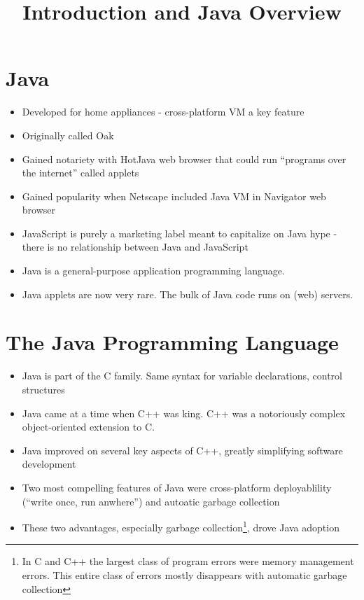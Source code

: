 \documentclass{article}
\title{Introduction and Java Overview}
\date{}
\begin{document}
\maketitle

\section{Java}

\begin{itemize}
\item Developed for home appliances - cross-platform VM a key feature
\item Originally called Oak
\item Gained notariety with HotJava web browser that could run ``programs over the internet'' called applets
\item Gained popularity when Netscape included Java VM in Navigator web browser
\item JavaScript is purely a marketing label meant to capitalize on Java hype - there is no relationship between Java and JavaScript
\item  Java is a general-purpose application programming language.
\item Java applets are now very rare.  The bulk of Java code runs on (web) servers.
\end{itemize}


\section{The Java Programming Language}


\begin{itemize}
\item Java is part of the C family.  Same syntax for variable
  declarations, control structures
\item Java came at a time when C++ was king.  C++ was a notoriously complex
  object-oriented extension to C.
\item Java improved on several key aspects of C++, greatly simplifying
  software development
\item Two most compelling features of Java were cross-platform
  deployablility (``write once, run anwhere'') and autoatic garbage
  collection
\item These two advantages, especially garbage collection\footnote{In
    C and C++ the largest class of program errors were memory
    management errors.  This entire class of errors mostly disappears
    with automatic garbage collection}, drove Java adoption
\end{itemize}
\end{document}
